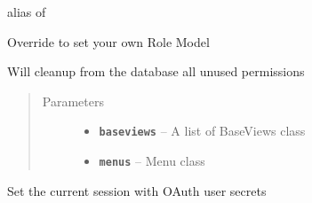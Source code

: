 \documentclass[letterpaper,10pt,english]{sphinxmanual}
\begin{document}
\begin{fulllineitems}
\begin{fulllineitems}
alias of 

\end{fulllineitems}


\begin{fulllineitems}
\label{api:flask.ext.appbuilder.security.manager.BaseSecurityManager.role_model}
Override to set your own Role Model

\end{fulllineitems}


\begin{fulllineitems}
\label{api:flask.ext.appbuilder.security.manager.BaseSecurityManager.security_cleanup}
Will cleanup from the database all unused permissions
\begin{quote}\begin{description}
\item[{Parameters}] \leavevmode\begin{itemize}
\item {} 
\textbf{\texttt{baseviews}} -- A list of BaseViews class

\item {} 
\textbf{\texttt{menus}} -- Menu class

\end{itemize}

\end{description}\end{quote}

\end{fulllineitems}


\begin{fulllineitems}
\label{api:flask.ext.appbuilder.security.manager.BaseSecurityManager.set_oauth_session}
Set the current session with OAuth user secrets

\end{fulllineitems}



\end{fulllineitems}
\end{document}
